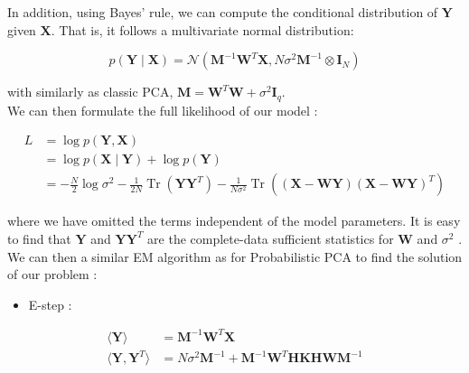 \documentclass{article}
\begin{document}
In addition, using Bayes’ rule, we can compute the conditional distribution of $\mathbf{Y}$ given $\mathbf{X}$. That is, it follows a multivariate normal distribution:

\begin{equation}
    p(\mathbf{Y} \mid \mathbf{X}) =  \mathcal{N}(\mathbf{M}^{-1} \mathbf{W}^T \mathbf{X}, N \sigma^2 \mathbf{M}^{-1} \otimes \mathbf{I}_N)
\end{equation}

with similarly as classic PCA, $\mathbf{M} = \mathbf{W}^T \mathbf{W} + \sigma^2 \mathbf{I}_q $.\\

We can then formulate the full likelihood of our model :

\begin{equation}
    \begin{aligned}
        L &=  \log p(\mathbf{Y},\mathbf{X})\\
        &=  \log p(\mathbf{X} \mid \mathbf{Y}) + \log p(\mathbf{Y}) \\
        &= - \frac{N}{2}  \log \sigma^2  - \frac{1}{2N} \operatorname{Tr}(\mathbf{Y} \mathbf{Y}^T) -  \frac{1}{N \sigma^2} \operatorname{Tr}((\mathbf{X} - \mathbf{W} \mathbf{Y})(\mathbf{X} - \mathbf{W} \mathbf{Y})^T)
    \end{aligned}
    \label{log_pkpca}
\end{equation}

where we have omitted the terms independent of the model parameters. It is easy to find that $\mathbf{Y}$ and $\mathbf{Y} \mathbf{Y}^T$ are the complete-data sufficient statistics for $\mathbf{W}$ and $\sigma^2$ . \\


We can then a similar EM algorithm as for Probabilistic PCA to find the solution of our problem :

\begin{itemize}
    \item E-step :
\end{itemize}

\begin{equation}
    \begin{aligned}
        \langle \mathbf{Y} \rangle &= \mathbf{M}^{-1} \mathbf{W}^T \mathbf{X} \\
        \langle \mathbf{Y},\mathbf{Y}^T \rangle &= N \sigma^2 \mathbf{M}^{-1} + \mathbf{M}^{-1} \mathbf{W}^T \mathbf{H} \mathbf{K} \mathbf{H} \mathbf{W} \mathbf{M}^{-1} 
    \end{aligned}
    \label{e_step_pkpca}
\end{equation}
\end{document}
